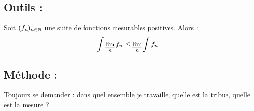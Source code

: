 \documentclass[11pt,a4paper]{article}
\begin{document}
\subsection*{Outils :}

\begin{lemma}[Fatou]
Soit $(f_n)_{n\in\mathbb N}$ une suite de fonctions mesurables positives. Alors :
\[\int \varliminf_n f_n \leq \varliminf_n \int f_n\]
\end{lemma}

\subsection*{Méthode :}

Toujours se demander : dans quel ensemble je travaille, quelle est la tribue, quelle est la mesure ?
\end{document}
